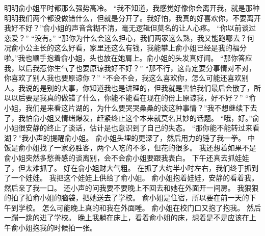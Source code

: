 明明俞小姐平时都那么强势高冷。
“我不知道，我感觉好像你会离开我，就是那种明明我们两个都没做错什么，但就是分开了。我好怕，我真的好喜欢你，不要离开我好不好？”俞小姐的声音含糊不清，毫无逻辑但莫名的让人心疼。
“你以前谈过恋爱？”
“没有。”
“那你为什么会这么担心，我们两家这么熟，我又能跑哪去？何况俞小公主长的这么好看，家里还这么有钱，我能攀上俞小姐已经是我的福分啦。”我也顺手抱着俞小姐，头也放在她肩上。俞小姐的头发真好闻。
“那你答应我，以后我惹你生气了也要原谅我好不好？”
“那不行，这肯定要分事情对不对，你喜欢了别人我也要原谅你？”
“不会不会，我这么喜欢你，怎么可能还喜欢别人。我说的是别的大事，你知道我也是讲理的，但我就是害怕我们最后会散了，所以以后要是我真的做错了什么，你能不能看在现在的份上原谅我，好不好？”
“俞小姐，我们是来看这片湖的，为什么要哭哭桑桑的谈这种事情？”我不想继续下去了，我怕俞小姐又情绪爆发，赶紧终止这个本来就莫名其妙的话题。
“哦，好。”俞小姐很安静的终止了谈话，估计是也意识到了自己的失态。
“那你能不能转过来看湖？”我小声的提醒俞小姐。
俞小姐头埋的更深了，然后用力的锤了我一拳。
中饭是俞小姐找了一家必胜客，两个人吃的不多，但花的很多。
我还想着如果不是俞小姐突然多愁善感的谈离别，会不会俞小姐要跟我表白。
下午还真去抓娃娃了，但太难抓了。
好在俞小姐财大气粗。
在抓了大约半小时左右，我们终于抓到了一个娃娃。
我把这个娃娃上供给了俞小姐。
俞小姐抱着娃娃，安静的看着我。
然后亲了我一口。
还小声的问我要不要晚上不回去和她在外面开一间房。
我狠狠的拍了拍俞小姐的脑袋，把她送去了学校。
俞小姐是住宿，所以要在前一天的下午到学校。
怎么可能晚上真的和我在外面睡。
俞小姐在校门口又抱了抱我。 然后一蹦一跳的进了学校。
晚上我躺在床上，看着俞小姐的床，想着是不是应该在上午俞小姐抱我的时候拍一张。

